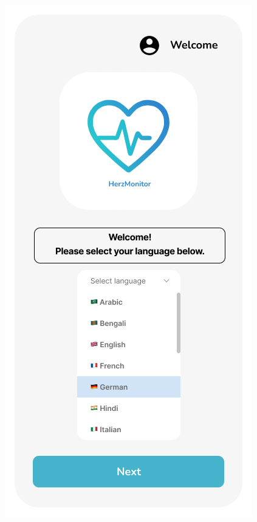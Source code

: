 \begin{figure}[h!]
	\centering
	\begin{minipage}{0.3\linewidth}
		\centering
		\includegraphics[width=\linewidth]{images/Sprachauswahl}

\end{minipage}
\end{figure}
